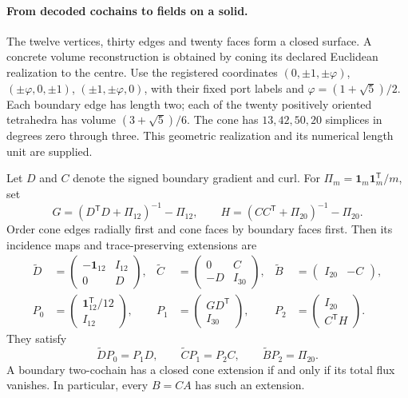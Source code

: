 \paragraph{From decoded cochains to fields on a solid.}
The twelve vertices, thirty edges and twenty faces form a closed surface.
A concrete volume reconstruction is obtained by coning its declared
Euclidean realization to the centre. Use the registered coordinates
\((0,\pm1,\pm\varphi)\), \((\pm\varphi,0,\pm1)\),
\((\pm1,\pm\varphi,0)\), with their fixed port labels and
\(\varphi=(1+\sqrt5)/2\). Each boundary edge has length two; each of the
twenty positively oriented tetrahedra has volume \((3+\sqrt5)/6\).
The cone has \(13,42,50,20\) simplices in degrees zero through three.
This geometric realization and its numerical length unit are supplied.

\begin{theorem}
\label{thm:cone-whitney-bridge}
Let \(D\) and \(C\) denote the signed boundary gradient and curl.
For \(\Pi_m=\mathbf1_m\mathbf1_m^{\mathsf T}/m\), set
\[
 G=(D^{\mathsf T}D+\Pi_{12})^{-1}-\Pi_{12},\qquad
 H=(CC^{\mathsf T}+\Pi_{20})^{-1}-\Pi_{20}.
\]
Order cone edges radially first and cone faces by boundary faces first.
Then its incidence maps and trace-preserving extensions are
\begin{align*}
 \widetilde D&=\begin{pmatrix}-\mathbf1_{12}&I_{12}\\0&D\end{pmatrix},&
 \widetilde C&=\begin{pmatrix}0&C\\-D&I_{30}\end{pmatrix},&
 \widetilde B&=\begin{pmatrix}I_{20}&-C\end{pmatrix},\\
 P_0&=\begin{pmatrix}\mathbf1_{12}^{\mathsf T}/12\\I_{12}\end{pmatrix},&
 P_1&=\begin{pmatrix}GD^{\mathsf T}\\I_{30}\end{pmatrix},&
 P_2&=\begin{pmatrix}I_{20}\\C^{\mathsf T}H\end{pmatrix}.
\end{align*}
They satisfy
\[
 \widetilde DP_0=P_1D,\qquad
 \widetilde CP_1=P_2C,\qquad
 \widetilde BP_2=\Pi_{20}.
\]
A boundary two-cochain has a closed cone extension if and only if its
total flux vanishes. In particular, every \(B=CA\) has such an extension.


\end{theorem}
